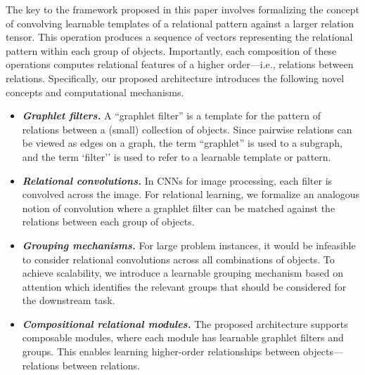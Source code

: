 The key to the framework proposed in this paper involves formalizing the concept of convolving learnable templates of a relational pattern against a larger relation tensor. This operation produces a sequence of vectors representing the relational pattern within each group of objects. Importantly, each composition of these operations computes relational features of a higher order---i.e., relations between relations. Specifically, our proposed architecture introduces the following novel concepts and computational mechanisms.
\begin{itemize}[itemsep=1pt]
    \item \textit{\bfseries Graphlet filters.} A ``graphlet filter'' is a template for the pattern of relations between a (small) collection of objects. 
    Since pairwise relations can be viewed as edges on a graph, the term ``graphlet'' is used to a subgraph, and the term `filter'' is used to refer to a learnable template or pattern.
    \item \textit{\bfseries Relational convolutions.} In CNNs for image processing, each filter is
    convolved across the image. For relational learning, we formalize an analogous notion of convolution where a graphlet filter can be matched against the relations between each group of objects.
    \item \textit{\bfseries Grouping mechanisms.} For large problem instances, it would be infeasible to consider relational convolutions across all combinations of objects. To achieve scalability, we introduce a learnable grouping mechanism based on attention which identifies the relevant groups that should be considered for the downstream task. %
    \item \textit{\bfseries Compositional relational modules.} The proposed architecture supports composable modules, where each module has learnable graphlet filters and groups. This enables learning higher-order relationships between objects---relations between relations.
\end{itemize}

